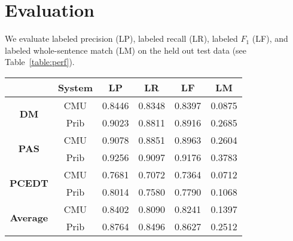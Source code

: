\documentclass[11pt]{article}
\newcommand{\bocomment}[1]{\textcolor{Bittersweet}{[#1 -BTO]}}
\newcommand{\sam}[1]{\textcolor{blue}{[#1 -SMT]}}
\begin{document}
\section{Evaluation}
\label{s:evaluation}

We evaluate labeled precision (LP), labeled recall (LR), labeled $F_1$ (LF), and
labeled whole-sentence match (LM) on the held out test data (see
Table~\ref{table:perf}).

% 
% 
% 
% 

% 
% 


\begin{table*}
\begin{center}
\begin{tabular*}{\textwidth}%
{@{\extracolsep{\fill}}cc|cccc}%
 & System & LP & LR & LF & LM \\
\hline
\hline
\multirow{2}{*}{\textbf{DM}}
& CMU & 0.8446 & 0.8348 & 0.8397 & 0.0875 \\
& Prib & 0.9023 & 0.8811 & 0.8916 & 0.2685 \\
\hline
\multirow{2}{*}{\textbf{PAS}}
& CMU & 0.9078 & 0.8851 & 0.8963 & 0.2604 \\
& Prib & 0.9256 & 0.9097 & 0.9176 & 0.3783 \\
\hline
\multirow{2}{*}{\textbf{PCEDT}}
& CMU & 0.7681 & 0.7072 & 0.7364 & 0.0712 \\
& Prib & 0.8014 & 0.7580 & 0.7790 & 0.1068 \\
\hline
\hline
\multirow{2}{*}{\textbf{Average}}
& CMU & 0.8402 & 0.8090 & 0.8241 & 0.1397 \\
& Prib & 0.8764 & 0.8496 & 0.8627 & 0.2512 \\
\end{tabular*}
\caption{Labeled precision (LP), recall (LR), $F_1$ (LF), and
whole-sentence match (LM) on the held out test data.
We show results for our system (CMU) and the winning system (Prib) \sam{how to
cite?}
\bocomment{why don't we show results for both logreg and the graph-based parser? did we not run all of them? i thought we did and that's why/how we picked the ones we did. maybe that was just hte devset?}
}
\label{table:perf}
\end{center}
\end{table*}
\end{document}
